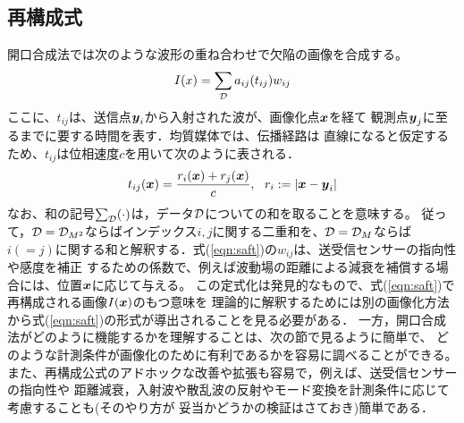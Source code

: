 \documentclass[10pt,a4j,dvipdfmx]{jarticle}
\begin{document}
\subsection{再構成式}
開口合成法では次のような波形の重ね合わせで欠陥の画像を合成する。
\begin{equation}
	I(x)=\sum_{\cal D}a_{ij}(t_{ij})w_{ij}
	\label{eqn:saft}
\end{equation}
ここに、$t_{ij}$は、送信点$\mbox{\boldmath $y$}_i$から入射された波が、画像化点$\mbox{\boldmath $x$}$を経て
観測点$\mbox{\boldmath $y$}_j$に至るまでに要する時間を表す．均質媒体では、伝播経路は
直線になると仮定するため、$t_{ij}$は位相速度$c$を用いて次のように表される．
\begin{equation}
	t_{ij}(\mbox{\boldmath $x$})=\frac{r_i(\mbox{\boldmath $x$})+r_j(\mbox{\boldmath $x$})}{c}, \ \ r_i:=\left| \mbox{\boldmath $x$} -\mbox{\boldmath $y$}_i\right|
	\label{eqn:tij}
\end{equation}
なお、和の記号$\sum_{\cal D}(\cdot)$は，データ$\cal D$についての和を取ることを意味する。
従って，${\cal D}= {\cal D}_{M^2}$ならばインデックス$i,j$に関する二重和を、${\cal D} ={\cal D}_M$ならば
$i(=j)$に関する和と解釈する．式(\ref{eqn:saft})の$w_{ij}$は、送受信センサーの指向性や感度を補正
するための係数で、例えば波動場の距離による減衰を補償する場合には、位置$\mbox{\boldmath $x$}$に応じて与える。
この定式化は発見的なもので、式(\ref{eqn:saft})で再構成される画像$I(\mbox{\boldmath $x$})$のもつ意味を
理論的に解釈するためには別の画像化方法から式(\ref{eqn:saft})の形式が導出されることを見る必要がある．
一方，開口合成法がどのように機能するかを理解することは、次の節で見るように簡単で、
どのような計測条件が画像化のために有利であるかを容易に調べることができる。
また、再構成公式のアドホックな改善や拡張も容易で，例えば、送受信センサーの指向性や
距離減衰，入射波や散乱波の反射やモード変換を計測条件に応じて考慮することも(そのやり方が
妥当かどうかの検証はさておき)簡単である．
\end{document}
